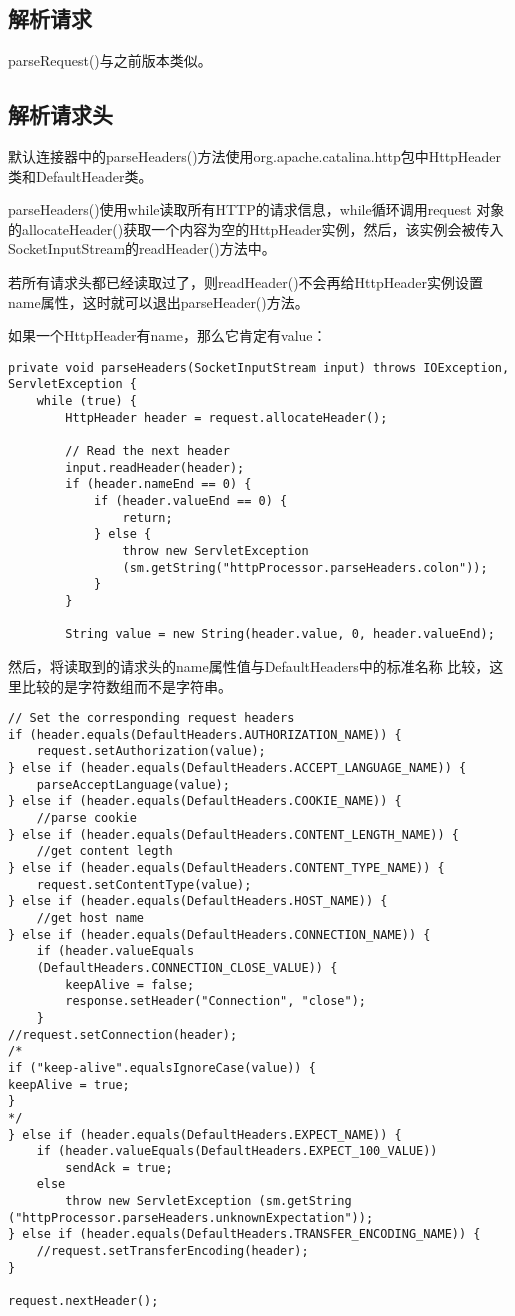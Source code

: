 \subsection{解析请求}
parseRequest()与之前版本类似。
\subsection{解析请求头}
默认连接器中的parseHeaders()方法使用org.apache.catalina.http包中HttpHeader类和DefaultHeader类。
\par parseHeaders()使用while读取所有HTTP的请求信息，while循环调用request
对象的allocateHeader()获取一个内容为空的HttpHeader实例，然后，该实例会被传入SocketInputStream的readHeader()方法中。
\par 若所有请求头都已经读取过了，则readHeader()不会再给HttpHeader实例设置name属性，这时就可以退出parseHeader()方法。
\par 如果一个HttpHeader有name，那么它肯定有value：
\begin{lstlisting}
private void parseHeaders(SocketInputStream input) throws IOException, ServletException {
	while (true) {
		HttpHeader header = request.allocateHeader();
		
		// Read the next header
		input.readHeader(header);
		if (header.nameEnd == 0) {
			if (header.valueEnd == 0) {
				return;
			} else {
				throw new ServletException
				(sm.getString("httpProcessor.parseHeaders.colon"));
			}
		}
		
		String value = new String(header.value, 0, header.valueEnd);		
\end{lstlisting}
\par 然后，将读取到的请求头的name属性值与DefaultHeaders中的标准名称
比较，这里比较的是字符数组而不是字符串。
\begin{lstlisting}
// Set the corresponding request headers
if (header.equals(DefaultHeaders.AUTHORIZATION_NAME)) {
	request.setAuthorization(value);
} else if (header.equals(DefaultHeaders.ACCEPT_LANGUAGE_NAME)) {
	parseAcceptLanguage(value);
} else if (header.equals(DefaultHeaders.COOKIE_NAME)) {
	//parse cookie
} else if (header.equals(DefaultHeaders.CONTENT_LENGTH_NAME)) {
	//get content legth
} else if (header.equals(DefaultHeaders.CONTENT_TYPE_NAME)) {
	request.setContentType(value);
} else if (header.equals(DefaultHeaders.HOST_NAME)) {
	//get host name
} else if (header.equals(DefaultHeaders.CONNECTION_NAME)) {
	if (header.valueEquals
	(DefaultHeaders.CONNECTION_CLOSE_VALUE)) {
		keepAlive = false;
		response.setHeader("Connection", "close");
	}
//request.setConnection(header);
/*
if ("keep-alive".equalsIgnoreCase(value)) {
keepAlive = true;
}
*/
} else if (header.equals(DefaultHeaders.EXPECT_NAME)) {
	if (header.valueEquals(DefaultHeaders.EXPECT_100_VALUE))
		sendAck = true;
	else
		throw new ServletException (sm.getString ("httpProcessor.parseHeaders.unknownExpectation"));
} else if (header.equals(DefaultHeaders.TRANSFER_ENCODING_NAME)) {
	//request.setTransferEncoding(header);
}

request.nextHeader();
\end{lstlisting}
